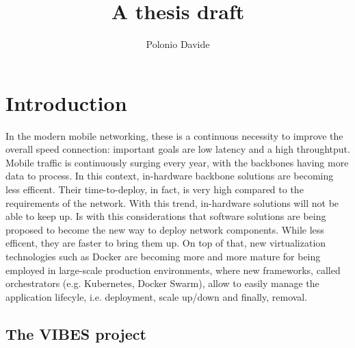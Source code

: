\documentclass[10pt]{book}
\author{Polonio Davide}
\title{A thesis draft}
\begin{document}
 \maketitle
 

 
 \chapter{Introduction}
 
 In the modern mobile networking, these is a continuous necessity to 
improve the overall speed connection: important goals are low latency and a 
high throughtput. Mobile traffic is continuously surging every year, with 
the backbones having more data to process. In this context, in-hardware 
backbone solutions are becoming less efficent. Their time-to-deploy, in fact, is 
very high compared to the requirements of the network. With this trend, 
in-hardware solutions will not be able to keep up. Is with this considerations 
that software solutions are being proposed to become the new way to deploy 
network components. While less efficent, they are faster to bring them up. On 
top of that, new virtualization technologies such as Docker are becoming more 
and more mature for being employed in large-scale production environments,
where new frameworks, called orchestrators (e.g. Kubernetes, Docker Swarm),
allow to easily manage the application lifecyle, i.e. deployment, scale up/down
and finally, removal.
 
 \section{The VIBES project}
\end{document}
